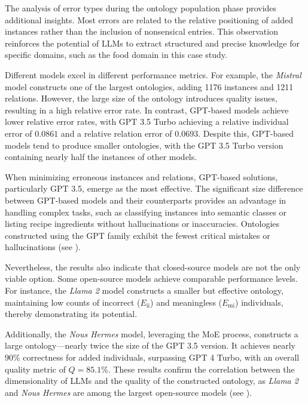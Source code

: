 The analysis of error types during the ontology population phase provides additional insights.
%
Most errors are related to the relative positioning of added instances rather than the inclusion of nonsensical entries.
%
This observation reinforces the potential of \glspl{LLM} to extract structured and precise knowledge for specific domains, such as the food domain in this case study.

Different models excel in different performance metrics.
%
For example, the \emph{Mistral} model constructs one of the largest ontologies, adding 1176 instances and 1211 relations.
%
However, the large size of the ontology introduces quality issues, resulting in a high relative error rate.
%
In contrast, GPT-based models achieve lower relative error rates, with GPT 3.5 Turbo achieving a relative individual error of \(0.0861\) and a relative relation error of \(0.0693\).
%
Despite this, GPT-based models tend to produce smaller ontologies, with the GPT 3.5 Turbo version containing nearly half the instances of other models.

When minimizing erroneous instances and relations, GPT-based solutions, particularly GPT 3.5, emerge as the most effective.
%
The significant size difference between GPT-based models and their counterparts provides an advantage in handling complex tasks, such as classifying instances into semantic classes or listing recipe ingredients without hallucinations or inaccuracies.
%
Ontologies constructed using the GPT family exhibit the fewest critical mistakes or hallucinations (see ).

Nevertheless, the results also indicate that closed-source models are not the only viable option.
%
Some open-source models achieve comparable performance levels.
%
For instance, the \emph{Llama 2} model constructs a smaller but effective ontology, maintaining low counts of incorrect (\(E_{\text{ii}}\)) and meaningless (\(E_{\text{mi}}\)) individuals, thereby demonstrating its potential.

Additionally, the \emph{Nous Hermes} model, leveraging the \gls{MoE} process, constructs a large ontology—nearly twice the size of the GPT 3.5 version.
%
It achieves nearly \(90\%\) correctness for added individuals, surpassing GPT 4 Turbo, with an overall quality metric of \(Q = 85.1\%\).
%
These results confirm the correlation between the dimensionality of \glspl{LLM} and the quality of the constructed ontology, as \emph{Llama 2} and \emph{Nous Hermes} are among the largest open-source models (see ).

